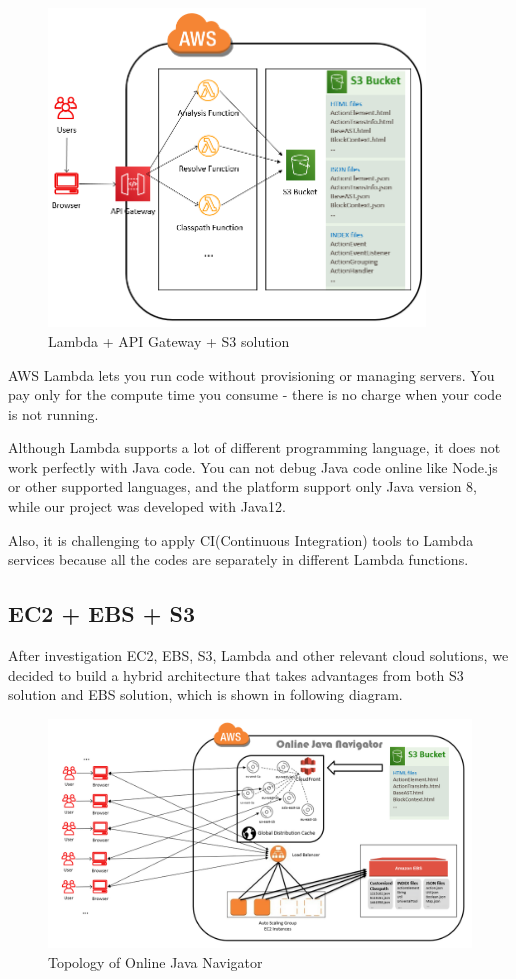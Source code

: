 \documentclass[runningheads]{llncs}
\begin{document}
\begin{figure}[H]
	\centering
	\includegraphics[width=10cm]{pic/lambda-s3.png}
	\caption{Lambda + API Gateway + S3 solution}
	\label{Lambda + API Gateway + S3 solution}
\end{figure}

AWS Lambda lets you run code without provisioning or managing servers. You pay only for the compute time you consume - there is no charge when your code is not running.

Although Lambda supports a lot of different programming language, it does not work perfectly with Java code. You can not debug Java code online like Node.js or other supported languages, and the platform support only Java version 8, while our project was developed with Java12.


Also, it is challenging to apply CI(Continuous Integration)\cite{Continuous_integration} tools to Lambda services because all the codes are separately in different Lambda functions.

\subsection{EC2 + EBS + S3}

After investigation EC2, EBS, S3, Lambda and other relevant cloud solutions, we decided to build a hybrid architecture that takes advantages from both S3 solution and EBS solution, which is shown in following diagram.

\begin{figure}[H]
	\centering
	\includegraphics[width=12cm]{pic/ojn-cloud-solution.png}
	\caption{Topology of Online Java Navigator}
	\label{Topology of Online Java Navigator}
\end{figure}
\end{document}
